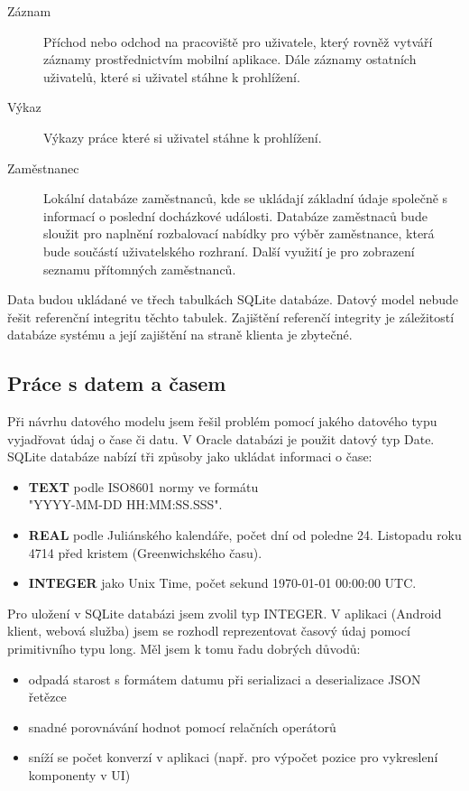 \documentclass{diplomka}
\begin{document}
\begin{description}
\item [Záznam]
Příchod nebo odchod na pracoviště pro uživatele, který rovněž vytváří záznamy prostřednictvím mobilní aplikace. Dále záznamy ostatních uživatelů, které si uživatel stáhne k prohlížení.
\item [Výkaz]
Výkazy práce které si uživatel stáhne k prohlížení.
\item [Zaměstnanec] 
Lokální databáze zaměstnanců, kde se ukládají základní údaje společně s informací o poslední docházkové události. Databáze zaměstnaců bude sloužit pro naplnění rozbalovací nabídky pro výběr zaměstnance, která bude součástí uživatelského rozhraní.
Další využití je pro zobrazení seznamu přítomných zaměstnanců.
\end{description}

Data budou ukládané ve třech tabulkách SQLite databáze. Datový model nebude řešit referenční integritu těchto tabulek. Zajištění referenčí integrity je záležitostí databáze systému a její zajištění na straně klienta je zbytečné.

\newpage
\subsection{Práce s datem a časem}
Při návrhu datového modelu jsem řešil problém pomocí jakého datového typu vyjadřovat údaj o čase či datu. V Oracle databázi je použit datový typ Date. SQLite databáze nabízí tři způsoby jako ukládat informaci o čase:
\begin{itemize}
\item \textbf{TEXT} podle ISO8601 normy ve formátu\\
"YYYY-MM-DD HH:MM:SS.SSS".
\item \textbf{REAL} podle Juliánského kalendáře, počet dní od poledne 24. Listopadu roku 4714 před kristem (Greenwichského času).
\item \textbf{INTEGER} jako Unix Time, počet sekund 1970-01-01 00:00:00 UTC.
\end{itemize}

\noindent
Pro uložení v SQLite databázi jsem zvolil typ INTEGER. V aplikaci (Android klient, webová služba) jsem se rozhodl reprezentovat časový údaj pomocí primitivního typu long. Měl jsem k tomu řadu dobrých důvodů:
\begin{itemize}
\item odpadá starost s formátem datumu při serializaci a deserializace JSON řetězce
\item snadné porovnávání hodnot pomocí relačních operátorů
\item sníží se počet konverzí v aplikaci (např. pro výpočet pozice pro vykreslení komponenty v UI)
\end{itemize}
\end{document}
